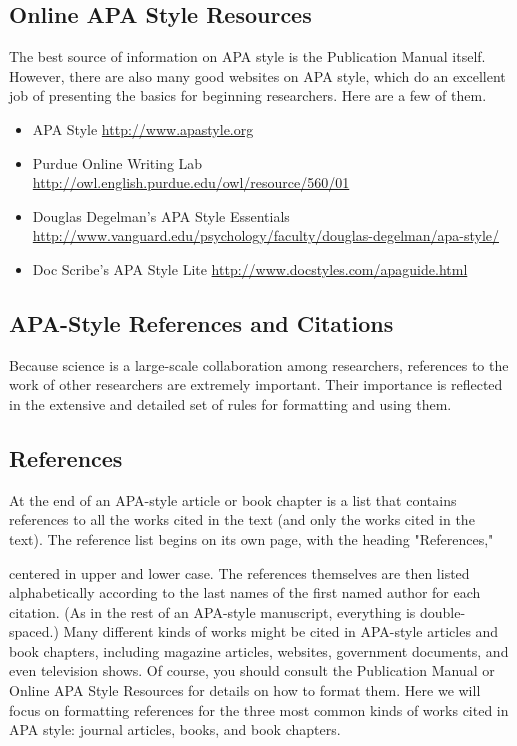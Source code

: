 \subsection{Online APA Style Resources}
 
 The best source of information on APA style is the Publication Manual itself. However, there are also many good websites on APA style, which do an excellent job of presenting the basics for beginning researchers. Here are a few of them.

 
 \begin{itemize}
 \item APA Style
\url{http://www.apastyle.org}
 \item Purdue Online Writing Lab \url{http://owl.english.purdue.edu/owl/resource/560/01}

 \item Douglas Degelman's APA Style Essentials
\url{http://www.vanguard.edu/psychology/faculty/douglas-degelman/apa-style/}

  \item Doc Scribe's APA Style Lite
\url{http://www.docstyles.com/apaguide.html}

 \end{itemize}
 
 \subsection{APA-Style References and Citations}
 
 Because science is a large-scale collaboration among researchers, references to the work of other researchers are extremely important. Their importance is reflected in the extensive and detailed set of rules for formatting and using them.

 
 \subsection{References}


At the end of an APA-style article or book chapter is a list that contains references to all the works cited in the text (and only the works cited in the text). The reference list begins on its own page, with the heading "References,"

centered in upper and lower case. The references themselves are then listed alphabetically according to the last names of the first named author for each citation. (As in the rest of an APA-style manuscript, everything is double- spaced.) Many different kinds of works might be cited in APA-style articles and book chapters, including magazine articles, websites, government documents, and even television shows. Of course, you should consult the Publication Manual or Online APA Style Resources for details on how to format them. Here we will focus on formatting references for the three most common kinds of works cited in APA style: journal articles, books, and book chapters.


